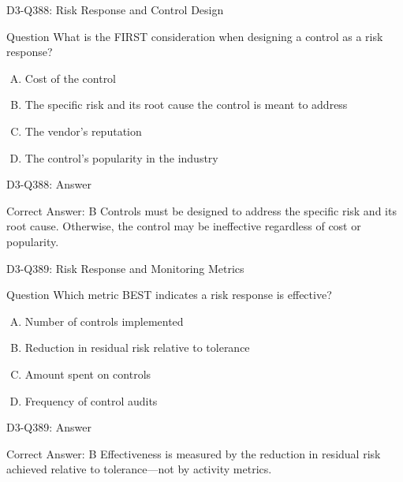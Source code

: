 \documentclass{beamer}
\begin{document}
\begin{frame}{D3-Q388: Risk Response and Control Design}
	\begin{block}{Question}
		What is the FIRST consideration when designing a control as a risk response?
	\end{block}
	\begin{enumerate}[(A)]
		\item Cost of the control
		\item The specific risk and its root cause the control is meant to address
		\item The vendor's reputation
		\item The control's popularity in the industry
	\end{enumerate}
\end{frame}
\begin{frame}{D3-Q388: Answer}
	\begin{block}{Correct Answer: B}
		Controls must be designed to address the specific risk and its root cause. Otherwise, the control may be ineffective regardless of cost or popularity.
	\end{block}
\end{frame}

\begin{frame}{D3-Q389: Risk Response and Monitoring Metrics}
	\begin{block}{Question}
		Which metric BEST indicates a risk response is effective?
	\end{block}
	\begin{enumerate}[(A)]
		\item Number of controls implemented
		\item Reduction in residual risk relative to tolerance
		\item Amount spent on controls
		\item Frequency of control audits
	\end{enumerate}
\end{frame}
\begin{frame}{D3-Q389: Answer}
	\begin{block}{Correct Answer: B}
		Effectiveness is measured by the reduction in residual risk achieved relative to tolerance—not by activity metrics.
	\end{block}
\end{frame}
\end{document}
